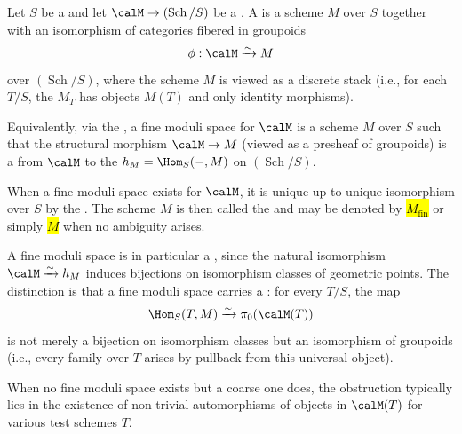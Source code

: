 \begin{definition} \label{definition:fine_moduli_space_for_a_moduli_problem_on_schemes}
    Let $S$ be a  and let $\calM \to (\operatorname{Sch}/S)$ be a . A  is a scheme $M$ over $S$ together with an isomorphism of categories fibered in groupoids
    $$\phi: \calM \xrightarrow{\sim} M$$
    over $(\operatorname{Sch}/S)$, where the scheme $M$ is viewed as a discrete stack (i.e., for each $T/S$, the  $M_T$ has objects $M(T)$ and only identity morphisms).

    Equivalently, via the , a fine moduli space for $\calM$ is a scheme $M$ over $S$ such that the structural morphism $\calM \to M$ (viewed as a presheaf of groupoids) is a  from $\calM$ to the  $h_M = \Hom_S(-, M)$ on $(\operatorname{Sch}/S)$.

    When a fine moduli space exists for $\calM$, it is unique up to unique isomorphism over $S$ by the . The scheme $M$ is then called the  and may be denoted by \hl{$M_{\mathrm{fin}}$} or simply \hl{$M$} when no ambiguity arises.

    A fine moduli space is in particular a , since the natural isomorphism $\calM \xrightarrow{\sim} h_M$ induces bijections on isomorphism classes of geometric points. The distinction is that a fine moduli space carries a : for every $T/S$, the map
    $$\Hom_S(T, M) \xrightarrow{\sim} \pi_0(\calM(T))$$
    is not merely a bijection on isomorphism classes but an isomorphism of groupoids (i.e., every family over $T$ arises by pullback from this universal object).

    When no fine moduli space exists but a coarse one does, the obstruction typically lies in the existence of non-trivial automorphisms of objects in $\calM(T)$ for various test schemes $T$.
\end{definition}
